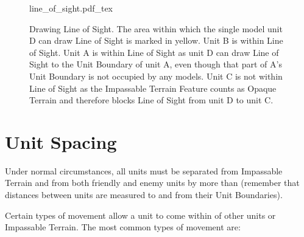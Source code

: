 \RBemc

\begin{figure}[H]
	\begin{minipage}{0.62\textwidth}
	\renewcommand{\figbiglettersize}{17}
	\def\svgwidth{\textwidth}
	{line_of_sight.pdf_tex}
	\end{minipage}\hfill\begin{minipage}{0.35\textwidth}
	\caption{Drawing Line of Sight.\captionposttitle
		The area within which the single model unit D can draw Line of Sight is marked in yellow.
		\captionlist
			\captionitem \textbullet{} Unit B is within Line of Sight.\newline
			\captionitem \textbullet{} Unit A is within Line of Sight as unit D can draw Line of Sight to the Unit Boundary of unit A, even though that part of A's Unit Boundary is not occupied by any models.\newline
			\captionitem \textbullet{} Unit C is not within Line of Sight as the Impassable Terrain Feature counts as Opaque Terrain and therefore blocks Line of Sight from unit D to unit C.%
	}
	\label{figure/line_of_sight}
	\end{minipage}
\end{figure}

\vspace{10pt}

\RBbmc

\section{Unit Spacing}
\label{unit_spacing}

Under normal circumstances, all units must be separated from Impassable Terrain and from both friendly and enemy units by more than  (remember that distances between units are measured to and from their Unit Boundaries).

Certain types of movement allow a unit to come within  of other units or Impassable Terrain. The most common types of movement are:

